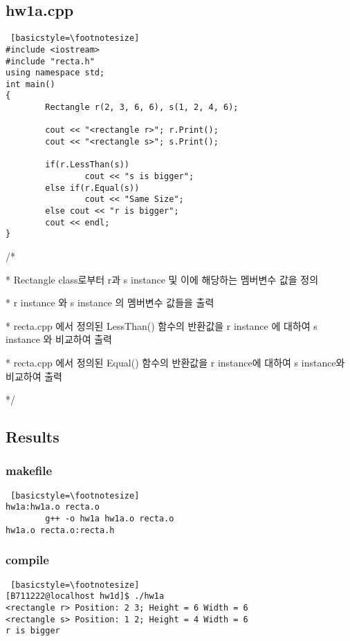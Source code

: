 \documentclass[twoside,twocolumn]{article}
\newenvironment{itemizeReduced}{
\begin{list}{\labelitemi}{\leftmargin=1em}
\setlength{\itemsep}{1pt}
\setlength{\parskip}{0pt}
\setlength{\parsep}{0pt}}{\end{list}
}
\begin{document}
\subsection{hw1a.cpp}
\begin{lstlisting} [basicstyle=\footnotesize]
#include <iostream>
#include "recta.h"
using namespace std;
int main()
{
        Rectangle r(2, 3, 6, 6), s(1, 2, 4, 6); 

        cout << "<rectangle r>"; r.Print();
        cout << "<rectangle s>"; s.Print();

        if(r.LessThan(s))
                cout << "s is bigger";
        else if(r.Equal(s))
                cout << "Same Size";
        else cout << "r is bigger";
        cout << endl;
}
\end{lstlisting}
\newpage
\begin{itemizeReduced}
    \item[/*] 
    \item[*] Rectangle class로부터 r과 s instance 및 이에 해당하는 멤버변수 값을 정의
    \item[*] r instance 와 s instance 의 멤버변수 값들을 출력
    \item[*] recta.cpp 에서 정의된 LessThan() 함수의 반환값을 r instance 에 대하여 s instance 와 비교하여 출력
    \item[*] recta.cpp 에서 정의된 Equal() 함수의 반환값을 r instance에 대하여 s instance와 비교하여 출력
\end{itemizeReduced}
*/

\subsection{Results}
\subsubsection{makefile}
\begin{lstlisting} [basicstyle=\footnotesize]
hw1a:hw1a.o recta.o
        g++ -o hw1a hw1a.o recta.o
hw1a.o recta.o:recta.h
\end{lstlisting}

\subsubsection{compile}
\begin{lstlisting} [basicstyle=\footnotesize]
[B711222@localhost hw1d]$ ./hw1a
<rectangle r> Position: 2 3; Height = 6 Width = 6
<rectangle s> Position: 1 2; Height = 4 Width = 6
r is bigger
\end{lstlisting}
\end{document}
